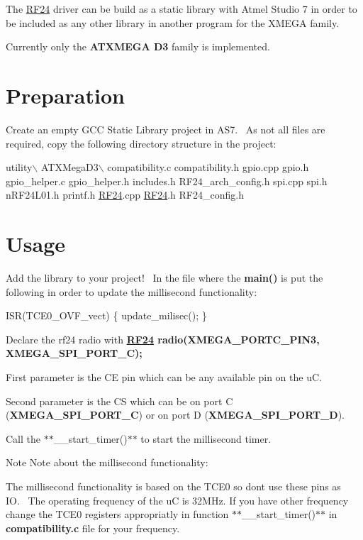 The \hyperlink{classRF24}{R\+F24} driver can be build as a static library with Atmel Studio 7 in order to be included as any other library in another program for the X\+M\+E\+GA family.

Currently only the {\bfseries A\+T\+X\+M\+E\+GA D3} family is implemented.\hypertarget{ATXMEGA_Preparation}{}\section{Preparation}\label{ATXMEGA_Preparation}
Create an empty G\+CC Static Library project in A\+S7.~\newline
 As not all files are required, copy the following directory structure in the project\+:


\begin{DoxyCode}
utility\(\backslash\)
  ATXMegaD3\(\backslash\)
    compatibility.c
    compatibility.h
    gpio.cpp
    gpio.h
    gpio\_helper.c
    gpio\_helper.h
    includes.h
    RF24\_arch\_config.h
    spi.cpp
    spi.h
nRF24L01.h
printf.h
\hyperlink{classRF24}{RF24}.cpp
\hyperlink{classRF24}{RF24}.h
RF24\_config.h
\end{DoxyCode}
\hypertarget{ATXMEGA_Usage}{}\section{Usage}\label{ATXMEGA_Usage}
Add the library to your project!~\newline
 In the file where the {\bfseries main()} is put the following in order to update the millisecond functionality\+:


\begin{DoxyCode}
ISR(TCE0\_OVF\_vect)
\{
   update\_milisec();
\}
\end{DoxyCode}


Declare the rf24 radio with {\bfseries \hyperlink{classRF24}{R\+F24} radio(\+X\+M\+E\+G\+A\+\_\+\+P\+O\+R\+T\+C\+\_\+\+P\+I\+N3, X\+M\+E\+G\+A\+\_\+\+S\+P\+I\+\_\+\+P\+O\+R\+T\+\_\+\+C);}

First parameter is the CE pin which can be any available pin on the uC.

Second parameter is the CS which can be on port C ({\bfseries X\+M\+E\+G\+A\+\_\+\+S\+P\+I\+\_\+\+P\+O\+R\+T\+\_\+C}) or on port D ({\bfseries X\+M\+E\+G\+A\+\_\+\+S\+P\+I\+\_\+\+P\+O\+R\+T\+\_\+D}).

Call the $\ast$$\ast$\+\_\+\+\_\+start\+\_\+timer()$\ast$$\ast$ to start the millisecond timer.

\begin{DoxyNote}{Note}
Note about the millisecond functionality\+:~\newline

\end{DoxyNote}
The millisecond functionality is based on the T\+C\+E0 so don\textquotesingle{}t use these pins as IO.~\newline
 The operating frequency of the uC is 32\+M\+Hz. If you have other frequency change the T\+C\+E0 registers appropriatly in function $\ast$$\ast$\+\_\+\+\_\+start\+\_\+timer()$\ast$$\ast$ in {\bfseries compatibility.\+c} file for your frequency. 